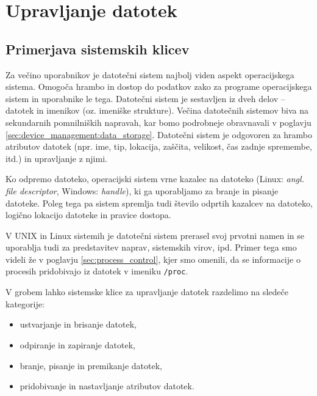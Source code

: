 \documentclass[a4paper,12pt,openright]{book}
\begin{document}
\chapter{Upravljanje datotek}

\section{Primerjava sistemskih klicev}

Za večino uporabnikov je datotečni sistem najbolj viden aspekt operacijskega sistema.
Omogoča hrambo in dostop do podatkov zako za programe operacijskega sistem in uporabnike le tega.
Datotečni sistem je sestavljen iz dveh delov -- datotek in imenikov (oz. imeniške strukture).
Večina datotečnih sistemov biva na sekundarnih pomnilniških napravah, kar bomo podrobneje obravnavali v poglavju \ref{sec:device_management:data_storage}.
Datotečni sistem je odgovoren za hrambo atributov datotek (npr. ime, tip, lokacija, zaščita, velikost, čas zadnje spremembe, itd.) in upravljanje z njimi.

Ko odpremo datoteko, operacijski sistem vrne kazalec na datoteko (Linux: \textit{angl. file descriptor}, Windows: \textit{handle}), ki ga uporabljamo za branje in pisanje datoteke.
Poleg tega pa sistem spremlja tudi število odprtih kazalcev na datoteko, logično lokacijo datoteke in pravice dostopa.
\cite{Silberschatz_Galvin_Gagne_2018}

V UNIX in Linux sistemih je datotečni sistem prerasel svoj prvotni namen in se uporablja tudi za predstavitev naprav, sistemskih virov, ipd.
Primer tega smo videli že v poglavju \ref{sec:process_control}, kjer smo omenili, da se informacije o procesih pridobivajo iz datotek v imeniku \verb|/proc|.

V grobem lahko sistemske klice za upravljanje datotek razdelimo na sledeče kategorije:
\begin{itemize}
	\item ustvarjanje in brisanje datotek,
	\item odpiranje in zapiranje datotek,
	\item branje, pisanje in premikanje datotek,
	\item pridobivanje in nastavljanje atributov datotek. \cite{Silberschatz_Galvin_Gagne_2018}
\end{itemize}
\end{document}
